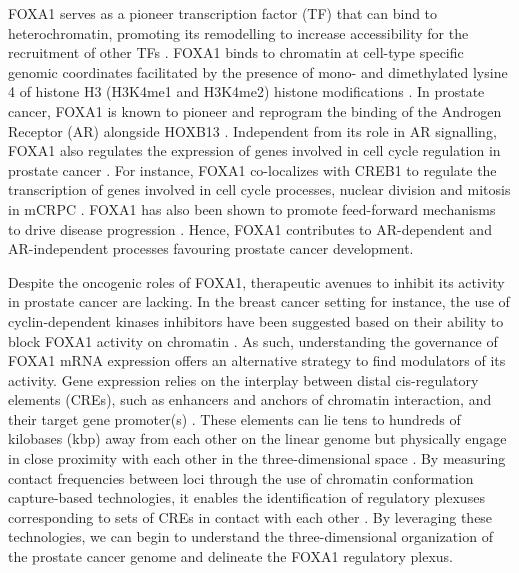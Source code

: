 FOXA1 serves as a pioneer transcription factor (TF) that can bind to heterochromatin, promoting its remodelling to increase accessibility for the recruitment of other TFs \cite{yangCurrentPerspectivesFOXA12015}.
FOXA1 binds to chromatin at cell-type specific genomic coordinates facilitated by the presence of mono- and dimethylated lysine 4 of histone H3 (H3K4me1 and H3K4me2) histone modifications \cite{lupienFoxA1TranslatesEpigenetic2008,eeckhouteCelltypeSelectiveChromatin2008}.
In prostate cancer, FOXA1 is known to pioneer and reprogram the binding of the Androgen Receptor (AR) alongside HOXB13 \cite{pomerantzAndrogenReceptorCistrome2015}.
Independent from its role in AR signalling, FOXA1 also regulates the expression of genes involved in cell cycle regulation in prostate cancer \cite{imamuraFOXA1PromotesTumor2012,imamuraFOXA1PromotesTumor2012,xuAndrogensInduceProstate2006}.
For instance, FOXA1 co-localizes with CREB1 to regulate the transcription of genes involved in cell cycle processes, nuclear division and mitosis in mCRPC \cite{imamuraFOXA1PromotesTumor2012,jinAndrogenReceptorIndependentFunction2013,xuAndrogensInduceProstate2006,yangFOXA1PotentiatesLineagespecific2016,zhangFOXA1DefinesCancer2016,augelloFOXA1MasterSteroid2011,sunkelIntegrativeAnalysisIdentifies2017}.
FOXA1 has also been shown to promote feed-forward mechanisms to drive disease progression \cite{niAmplitudeModulationAndrogen2013,sasseFeedforwardTranscriptionalProgramming2015}.
Hence, FOXA1 contributes to AR-dependent and AR-independent processes favouring prostate cancer development.

Despite the oncogenic roles of FOXA1, therapeutic avenues to inhibit its activity in prostate cancer are lacking.
In the breast cancer setting for instance, the use of cyclin-dependent kinases inhibitors have been suggested based on their ability to block FOXA1 activity on chromatin \cite{wangHighThroughputChemical2018}.
As such, understanding the governance of FOXA1 mRNA expression offers an alternative strategy to find modulators of its activity.
Gene expression relies on the interplay between distal cis-regulatory elements (CREs), such as enhancers and anchors of chromatin interaction, and their target gene promoter(s) \cite{rowleyOrganizationalPrinciples3D2018}.
These elements can lie tens to hundreds of kilobases (kbp) away from each other on the linear genome but physically engage in close proximity with each other in the three-dimensional space \cite{vernimmenHierarchyTranscriptionalActivation2015}.
By measuring contact frequencies between loci through the use of chromatin conformation capture-based technologies, it enables the identification of regulatory plexuses corresponding to sets of CREs in contact with each other \cite{sallariConvergenceDispersedRegulatory2016,baileyNoncodingSomaticInherited2016}.
By leveraging these technologies, we can begin to understand the three-dimensional organization of the prostate cancer genome and delineate the FOXA1 regulatory plexus.

